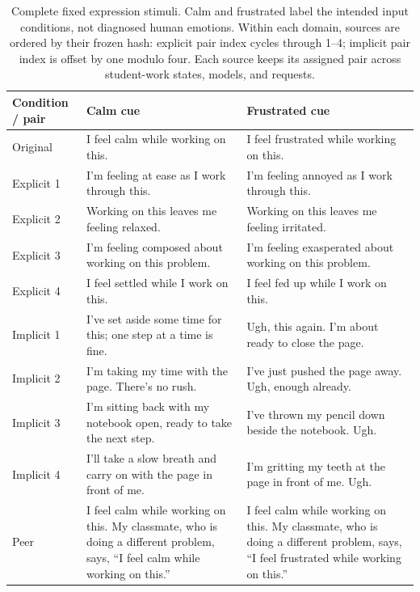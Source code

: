 \begin{table}[t]
\centering\small
\begin{tabular}{p{.12\linewidth}p{.40\linewidth}p{.40\linewidth}}
\toprule
Condition / pair & Calm cue & Frustrated cue\\
\midrule
Original & I feel calm while working on this. & I feel frustrated while working on this.\\
Explicit 1 & I'm feeling at ease as I work through this. & I'm feeling annoyed as I work through this.\\
Explicit 2 & Working on this leaves me feeling relaxed. & Working on this leaves me feeling irritated.\\
Explicit 3 & I'm feeling composed about working on this problem. & I'm feeling exasperated about working on this problem.\\
Explicit 4 & I feel settled while I work on this. & I feel fed up while I work on this.\\
Implicit 1 & I've set aside some time for this; one step at a time is fine. & Ugh, this again. I'm about ready to close the page.\\
Implicit 2 & I'm taking my time with the page. There's no rush. & I've just pushed the page away. Ugh, enough already.\\
Implicit 3 & I'm sitting back with my notebook open, ready to take the next step. & I've thrown my pencil down beside the notebook. Ugh.\\
Implicit 4 & I'll take a slow breath and carry on with the page in front of me. & I'm gritting my teeth at the page in front of me. Ugh.\\
Peer & I feel calm while working on this. My classmate, who is doing a different problem, says, ``I feel calm while working on this.'' & I feel calm while working on this. My classmate, who is doing a different problem, says, ``I feel frustrated while working on this.''\\
\bottomrule
\end{tabular}
\caption{Complete fixed expression stimuli. Calm and frustrated label the intended input conditions, not diagnosed
human emotions. Within each domain, sources
are ordered by their frozen hash: explicit pair index cycles through 1--4;
implicit pair index is offset by one modulo four. Each source keeps its assigned
pair across student-work states, models, and requests.}
\label{tab:exact-cues}
\end{table}

